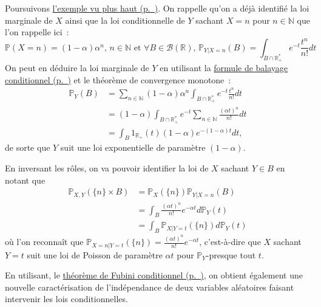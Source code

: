 \begin{exemple}\label{III-pour-fixer-les-iduxe9es-2}

Poursuivons \protect\hyperref[III-ex1]{l'exemple vu plus
haut (p.~\pageref*{III-ex1})}. On rappelle qu'on a déjà identifié la loi
marginale de \(X\) ainsi que la loi conditionnelle de \(Y\) sachant
\(X=n\) pour \(n\in\mathbb{N}\) que l'on rappelle ici~:
\[\mathbb{P}(X=n) = (1-\alpha)\alpha^n,\,n\in\mathbb{N}\text{ et }\forall  B \in \mathcal{B}(\mathbb{R}), \, \mathbb{P}_{Y|X=n}(B) = \int_{B \cap \mathbb{R}_+^\ast} e^{-t}\frac{t^n}{n!}dt\]
On peut en déduire la loi marginale de \(Y\) en utilisant la
\protect\hyperref[III-balcond]{formule de balayage
conditionnel (p.~\pageref*{III-balcond})} et le théorème de convergence
monotone~: \[\begin{aligned}
\mathbb{P}_Y(B)  &= \sum_{n \in \mathbb{N}} (1-\alpha)\alpha^n \int_{B \cap \mathbb{R}_+^\ast} e^{-t}\frac{t^n}{n!} dt\\
         &= (1-\alpha) \int_{B \cap \mathbb{R}_+^\ast} e^{-t} \sum_{n \in \mathbb{N}} \frac{(\alpha t)^n}{n!} dt \\
         &= \int_B 1_{\mathbb{R}_+}(t)(1-\alpha) e^{-(1-\alpha)t} dt,
\end{aligned}\] de sorte que \(Y\) suit une loi exponentielle de
paramètre \((1-\alpha)\).

En inversant les rôles, on va pouvoir identifier la loi de \(X\) sachant
\(Y \in B\) en notant que \begin{align*}
\mathbb{P}_{X,Y}(\{n\} \times B) &= \mathbb{P}_X(\{n\})\mathbb{P}_{Y|X=n}(B) \\
                         &= \int_B \frac{(\alpha t)^n}{n!} e^{-\alpha t} d\mathbb{P}_Y(t)\\
                         &= \int_B \mathbb{P}_{X | Y =t}(\{n\}) d\mathbb{P}_Y(t)
\end{align*} où l'on reconnaît que
\(\mathbb{P}_{X =n | Y =t}(\{n\}) = \frac{(\alpha t)^n}{n!} e^{-\alpha t}\),
c'est-à-dire que \(X\) sachant \(Y = t\) suit une loi de Poisson de
paramètre \(\alpha t\) pour \(\mathbb{P}_Y\)-presque tout \(t\).
\end{exemple}

En utilisant, le \protect\hyperref[III-fubinicond]{théorème de Fubini
conditionnel (p.~\pageref*{III-fubinicond})}, on obtient également une
nouvelle caractérisation de l'indépendance de deux variables aléatoires
faisant intervenir les lois conditionnelles.

